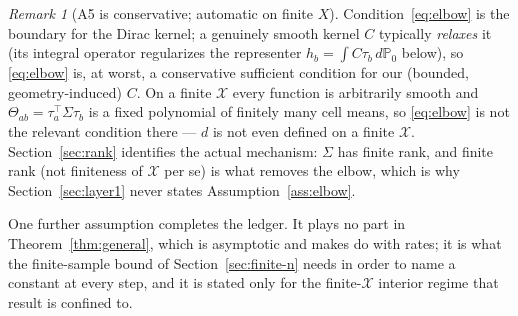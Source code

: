 \documentclass[11pt]{article}
\theoremstyle{plain}
\theoremstyle{definition}
\theoremstyle{remark}
\newtheorem{remark}[theorem]{Remark}
\newcommand{\PP}{\mathbb{P}}
\newcommand{\cX}{\mathcal{X}}
\begin{document}
\begin{remark}[A5 is conservative; automatic on finite $X$]\label{rem:A5-conservative}
Condition~\eqref{eq:elbow} is the boundary for the Dirac kernel; a genuinely smooth
kernel $C$ typically \emph{relaxes} it (its integral operator regularizes the
representer $h_b=\int C\tau_b\,d\PP_0$ below), so \eqref{eq:elbow} is, at worst, a
conservative sufficient condition for our (bounded, geometry-induced) $C$. On a finite
$\cX$ every function is arbitrarily smooth and $\Theta_{ab}=\tau_a^\top\Sigma\tau_b$ is
a fixed polynomial of finitely many cell means, so \eqref{eq:elbow} is not the relevant
condition there --- $d$ is not even defined on a finite $\cX$. Section~\ref{sec:rank}
identifies the actual mechanism: $\Sigma$ has finite rank, and finite rank (not
finiteness of $\cX$ per se) is what removes the elbow, which is why
Section~\ref{sec:layer1} never states Assumption~\ref{ass:elbow}.
\end{remark}

One further assumption completes the ledger. It plays no part in
Theorem~\ref{thm:general}, which is asymptotic and makes do with rates; it is what the
finite-sample bound of Section~\ref{sec:finite-n} needs in order to name a constant at
every step, and it is stated only for the finite-$\cX$ interior regime that result is
confined to.
\end{document}
